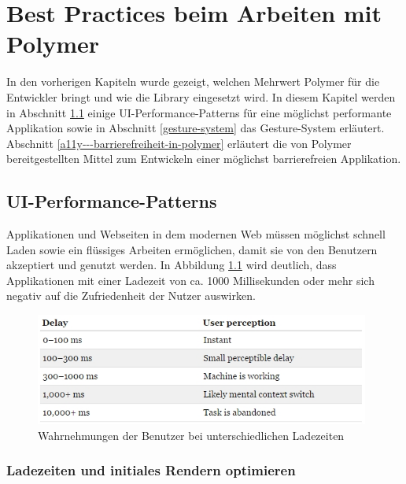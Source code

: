 \chapter{Best Practices beim Arbeiten mit Polymer}\label{best-practices-beim-arbeiten-mit-polymer}

In den vorherigen Kapiteln wurde gezeigt, welchen Mehrwert Polymer für die Entwickler bringt und wie die Library eingesetzt wird. In diesem Kapitel werden in Abschnitt \ref{ui-performance-patterns} einige \ac{UI}-Performance-Patterns für eine möglichst performante Applikation sowie in Abschnitt \ref{gesture-system} das Gesture-System erläutert. Abschnitt \ref{a11y---barrierefreiheit-in-polymer} erläutert die von Polymer bereitgestellten Mittel zum Entwickeln einer möglichst barrierefreien Applikation.


\section{UI-Performance-Patterns}\label{ui-performance-patterns}

Applikationen und Webseiten in dem modernen Web müssen möglichst schnell Laden sowie ein flüssiges Arbeiten ermöglichen, damit sie von den Benutzern akzeptiert und genutzt werden. In Abbildung \ref{fig:vwdbbul} wird deutlich, dass Applikationen mit einer Ladezeit von ca. 1000 Millisekunden oder mehr sich negativ auf die Zufriedenheit der Nutzer auswirken. \cite{citeulike:13262776}

\begin{figure}[htbp]
 \centering
 \includegraphics[width=11cm,keepaspectratio]{kapitel6/bilder/1-performance-user-perception-reaction-times}
 \caption{Wahrnehmungen der Benutzer bei unterschiedlichen Ladezeiten}
 \label{fig:vwdbbul}
\end{figure}


\subsection{Ladezeiten und initiales Rendern optimieren}\label{ladezeiten-und-initiales-rendern-optimieren}

